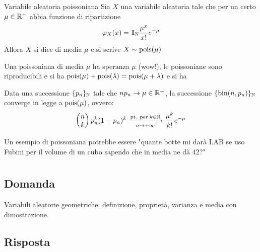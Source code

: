 \documentclass{article}
\begin{document}
\begin{definition}{Variabile aleatoria poissoniana}{}
    Sia $X$ una variabile aleatoria tale che per un certo $\mu \in \mathbb{R}^+$ abbia funzione di ripartizione
    \[\varphi_X(x) = \mathbf{1}_{\mathbb{N}} \frac{\mu^x }{x!}e^{-\mu}\]
    Allora $X$ si dice  di media $\mu$ e si scrive $X\sim\operatorname{pois}(\mu)$
\end{definition}
Una poissoniana di media $\mu$ ha speranza $\mu$ (wow!), le poissoniane sono riproducibili e si ha $\operatorname{pois}(\mu) + \operatorname{pois}(\lambda) = \operatorname{pois}(\mu + \lambda)$ e si ha
\begin{proposition}{}{}
    Data una successione $\{p_n\}_{\mathbb{N}}$ tale che $np_n \to \mu \in \mathbb{R}^+$, la successione $\{\operatorname{bin}(n,p_n)\}_{\mathbb{N}}$ converge in legge a $\operatorname{pois}(\mu)$, ovvero:
    \[\begin{pmatrix} n \\ k \end{pmatrix} p_n^k(1-p_n)^k \xrightarrow[n\to +\infty]{\text{pt. per }k \in \mathbb{N}} \frac{\mu^k}{k!} e^{-\mu}\]
\end{proposition}
Un esempio di poissoniana potrebbe essere "quante botte mi darà LAB se uso Fubini per il volume di un cubo sapendo che in media ne dà 42?"

\section{}%

\subsection*{Domanda}

Variabili aleatorie geometriche: definizione, proprietà, varianza e media con dimostrazione.

\subsection*{Risposta}
\end{document}

